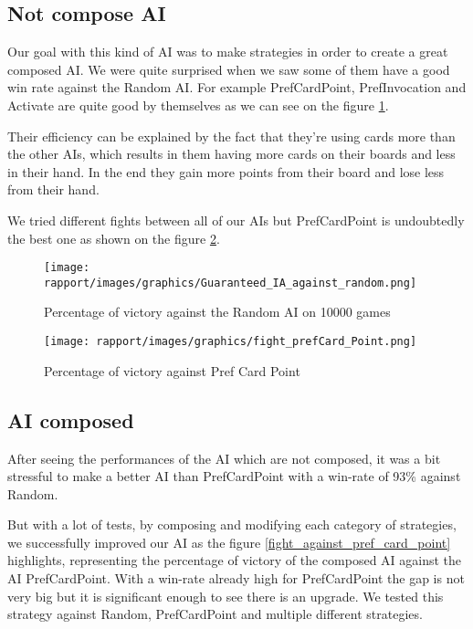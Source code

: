        \subsection{Not compose AI}
            Our goal with this kind of AI was to make strategies in order to create a great composed AI. We were quite surprised when we saw some of them have a good win rate against the Random AI. For example PrefCardPoint, PrefInvocation and Activate are quite good by themselves as we can see on the figure \ref{fight_images_not_compose_ia}. 
            
            Their efficiency can be explained by the fact that they're using cards more than the other AIs, which results in them having more cards on their boards and less in their hand. In the end they gain more points from their board and lose less from their hand.
            
            We tried different fights between all of our AIs but PrefCardPoint is undoubtedly the best one as shown on the figure \ref{fight_best_img}.

            \begin{figure}[H]
                \centering
                \texttt{[image: rapport/images/graphics/Guaranteed\_IA\_against\_random.png]}
                \caption{Percentage of victory against the Random AI on 10000 games}
                \label{fight_images_not_compose_ia}
            \end{figure}
            
            \begin{figure}[H]
                \centering
                \texttt{[image: rapport/images/graphics/fight\_prefCard\_Point.png]}
                \caption{Percentage of victory against Pref Card Point}
                \label{fight_best_img}
            \end{figure}
            
        \subsection{AI composed}
            After seeing the performances of the AI which are not composed, it was a bit stressful to make a better AI than PrefCardPoint with a win-rate of 93\% against Random.
            
            
            But with a lot of tests, by composing and modifying each category of strategies, we successfully improved our AI as the figure \ref{fight_against_pref_card_point} highlights, representing the percentage of victory of the composed AI against the AI PrefCardPoint.
            With a win-rate already high for PrefCardPoint the gap is not very big but it is significant enough to see there is an upgrade.
            We tested this strategy against Random, PrefCardPoint and multiple different strategies.
            
